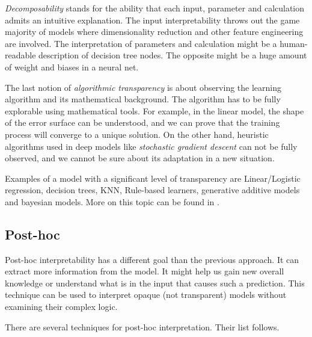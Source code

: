 \emph{Decomposability} stands for the ability that each input, parameter and calculation admits an intuitive explanation. The input interpretability throws out the game majority of models where dimensionality reduction and other feature engineering are involved. The interpretation of parameters and calculation might be a human-readable description of decision tree nodes. The opposite might be a huge amount of weight and biases in a neural net.

The last notion of \emph{algorithmic transparency} is about observing the learning algorithm and its mathematical background. The algorithm has to be fully explorable using mathematical tools. For example, in the linear model, the shape of the error surface can be understood, and we can prove that the training process will converge to a unique solution. On the other hand, heuristic algorithms used in deep models like \emph{stochastic gradient descent} can not be fully observed, and we cannot be sure about its adaptation in a new situation.

Examples of a model with a significant level of transparency are Linear/Logistic regression, decision trees, KNN, Rule-based learners, generative additive models and bayesian models. More on this topic can be found in \cite{Arrieta2019}.

\subsection{Post-hoc}
Post-hoc interpretability has a different goal than the previous approach. It can extract more information from the model. It might help us gain new overall knowledge or understand what is in the input that causes such a prediction. This technique can be used to interpret opaque (not transparent) models without examining their complex logic.

There are several techniques for post-hoc interpretation. Their list follows.


